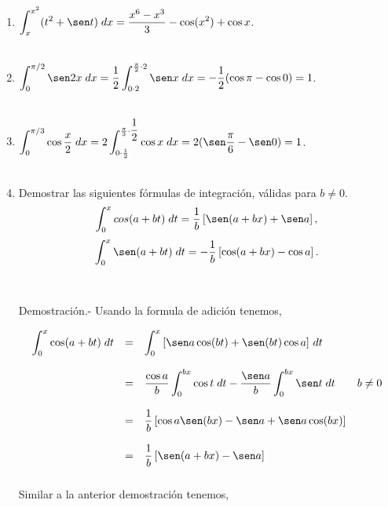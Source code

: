 \begin{enumerate}
\item $\displaystyle\int_{x}^{x^2}(t^2+\sen t)\; dx = \dfrac{x^6-x^3}{3} - \cos (x^2) + \cos x$.\\\\

\item $\displaystyle\int_0^{\pi/2} \sen 2 x\; dx = \dfrac{1}{2}\int_{0\cdot 2}^{\frac{\pi}{2}\cdot 2}  \sen x\; dx = -\dfrac{1}{2}(\cos \pi -\cos 0) = 1$.\\\\

\item $\displaystyle\int_0^{\pi/3} \cos \dfrac{x}{2}\; dx =2 \int_{0\cdot \frac{1}{2}}^{\frac{\pi}{3}\cdot \dfrac{1}{2}}\cos x \; dx = 2 (\sen \dfrac{\pi}{6} - \sen 0) = 1$.\\\\


\item Demostrar las siguientes fórmulas de integración, válidas para $b\neq 0$.
    $$\int_0^x cos(a+bt)\; dt = \dfrac{1}{b}\left[\sen(a+bx)+\sen a\right],$$
    $$\int_0^x \sen (a+bt)\; dt = -\dfrac{1}{b} \left[\cos(a+bx)-\cos a\right].$$\\\\
	Demostración.-\; Usando la formula de adición tenemos,

	$$\begin{array}{rcl}
	    \displaystyle\int_0^x \cos(a+bt)\; dt&=&\displaystyle\int_0^x \left[\sen a \cos(bt)+\sen(bt)\cos a\right]\, dt\\\\
						 &=&\dfrac{\cos a}{b} \displaystyle\int_0^{bx} \cos t \; dt  - \dfrac{\sen a}{b} \displaystyle\int_0^{bx} \sen t \; dt \qquad b\neq 0\\\\
						 &=&\dfrac{1}{b}\left[\cos a \sen(bx)-\sen a + \sen a \cos(bx)\right]\\\\
						 &=&\dfrac{1}{b}\left[\sen(a+bx)-\sen a\right]\\\\

	\end{array}$$
	Similar a la anterior demostración tenemos, \\


\end{enumerate}
